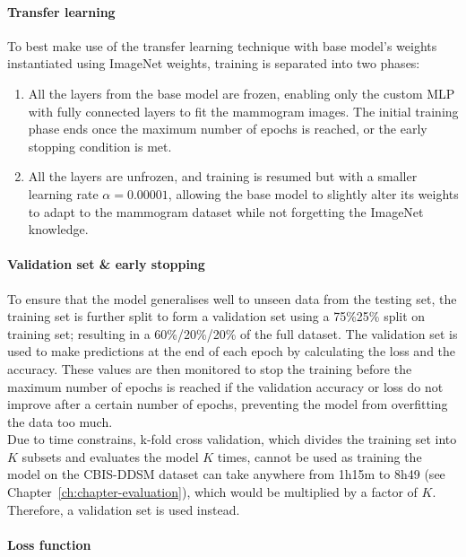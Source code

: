 \paragraph{Transfer learning}

To best make use of the transfer learning technique with base model's weights instantiated using ImageNet weights, training is separated into two phases:
\begin{enumerate}
    \item All the layers from the base model are frozen, enabling only the custom MLP with fully connected layers to fit the mammogram images. The initial training phase ends once the maximum number of epochs is reached, or the early stopping condition is met.
    \item All the layers are unfrozen, and training is resumed but with a smaller learning rate $\alpha = 0.00001$, allowing the base model to slightly alter its weights to adapt to the mammogram dataset while not forgetting the ImageNet knowledge.
\end{enumerate}

\paragraph{Validation set \& early stopping}

To ensure that the model generalises well to unseen  data from the testing set, the training set is further split to form a validation set using a 75\%25\% split on training set; resulting in a 60\%/20\%/20\% of the full dataset. The validation set is used to make predictions at the end of each epoch by calculating the loss and the accuracy. These values are then monitored to stop the training before the maximum number of epochs is reached if the validation accuracy or loss do not improve after a certain number of epochs, preventing the model from overfitting the data too much.\\

Due to time constrains, k-fold cross validation, which divides the training set into $K$ subsets and evaluates the model $K$ times, cannot be used as training the model on the CBIS-DDSM dataset can take anywhere from 1h15m to 8h49 (see Chapter~\ref{ch:chapter-evaluation}), which would be multiplied by a factor of $K$. Therefore, a validation set is used instead.

\paragraph{Loss function}

